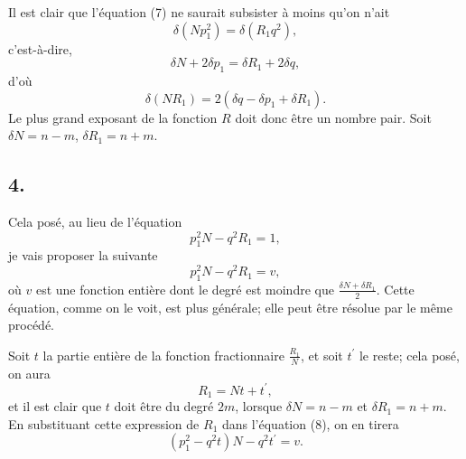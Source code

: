 \documentclass[oneside, 12 pt, leqno]{memoir}
\begin{document}
Il est clair que l'équation (7) ne saurait subsister à moins qu'on n'ait 
\[\delta\left(N p_1^2\right)=\delta\left(R_1 q^2\right), \]
c'est-à-dire, 
\[\delta N+2 \delta p_1=\delta R_1+2 \delta q,\]
d'où
\[\delta\left(N R_1\right)=2\left(\delta q-\delta p_1+\delta R_1\right).\]
Le plus grand exposant de la fonction \(R\) doit donc être un nombre pair. Soit \(\delta N=n-m\), \(\delta R_1=n+m\).

\subsection*{4.}

Cela posé, au lieu de l'équation
\[p_1^2 N-q^2 R_1=1,\]
je vais proposer la suivante
\[\tag{8}p_1^2 N-q^2 R_1=v,\]
où \(v\) est une fonction entière dont le degré est moindre que \(\frac{\delta N+\delta R_1}{2}\). Cette équation, comme on le voit, est plus générale; elle peut être résolue par le même procédé.

Soit \(t\) la partie entière de la fonction fractionnaire \(\frac{R_1}{N}\), et soit \(t^{\prime}\) le reste; cela posé, on aura
\[\tag{9}R_1=N t+t^{\prime},\]
et il est clair que \(t\) doit être du degré \(2 m\), lorsque \(\delta N=n-m\) et \(\delta R_1=n+m\). En substituant cette expression de \(R_1\) dans l'équation (8), on en tirera
\[\tag{10}\left(p_1^2-q^2 t\right) N-q^2 t^{\prime}=v.\]
\end{document}
